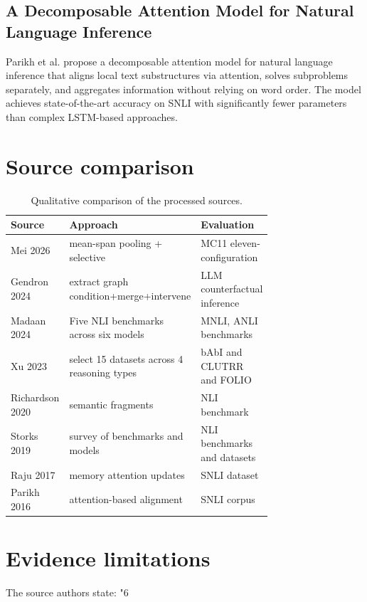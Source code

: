 \documentclass{article}\usepackage{amsmath,amssymb,graphicx,url}
\begin{document}
\subsection{A Decomposable Attention Model for Natural Language Inference}
Parikh et al. propose a decomposable attention model for natural language inference that aligns local text substructures via attention, solves subproblems separately, and aggregates information without relying on word order. The model achieves state-of-the-art accuracy on SNLI with significantly fewer parameters than complex LSTM-based approaches. \cite{parikh2016decomposable}

\section{Source comparison}
\begin{table}[H]\centering
\caption{Qualitative comparison of the processed sources.}
\begin{tabular}{|>{\raggedright\arraybackslash}p{0.26\linewidth}|>{\raggedright\arraybackslash}p{0.235\linewidth}|>{\raggedright\arraybackslash}p{0.235\linewidth}|}\hline
Source & Approach & Evaluation \\ \hline
Mei 2026 \cite{mei2026improving} & mean-span pooling + selective & MC11 eleven-configuration \\ \hline
Gendron 2024 \cite{gendron2024counterfactual} & extract graph condition+merge+intervene & LLM counterfactual inference \\ \hline
Madaan 2024 \cite{madaan2024lost} & Five NLI benchmarks across six models & MNLI, ANLI benchmarks \\ \hline
Xu 2023 \cite{xu2023large} & select 15 datasets across 4 reasoning types & bAbI and CLUTRR and FOLIO \\ \hline
Richardson 2020 \cite{richardson2020probing} & semantic fragments & NLI benchmark \\ \hline
Storks 2019 \cite{storks2019recent} & survey of benchmarks and models & NLI benchmarks and datasets \\ \hline
Raju 2017 \cite{raju2017dynamic} & memory attention updates & SNLI dataset \\ \hline
Parikh 2016 \cite{parikh2016decomposable} & attention-based alignment & SNLI corpus \\ \hline
\end{tabular}\end{table}
\section{Evidence limitations}
The source authors state: "6
\end{document}

